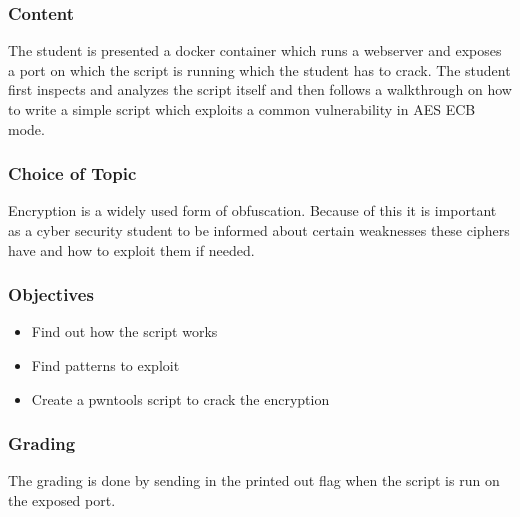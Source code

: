 \subsubsection*{Content}
The student is presented a docker container which runs a webserver and exposes a port on which the script is running which the student has to crack. The student first inspects and analyzes the script itself and then follows a walkthrough on how to write a simple script which exploits a common vulnerability in AES ECB mode. 
\subsubsection*{Choice of Topic}
Encryption is a widely used form of obfuscation. Because of this it is important as a cyber security student to be informed about certain weaknesses these ciphers have and how to exploit them if needed. 
\subsubsection*{Objectives}
\begin{itemize}
    \item Find out how the script works
    \item Find patterns to exploit
    \item Create a pwntools script to crack the encryption
\end{itemize}
\subsubsection*{Grading}
The grading is done by sending in the printed out flag when the script is run on the exposed port.
